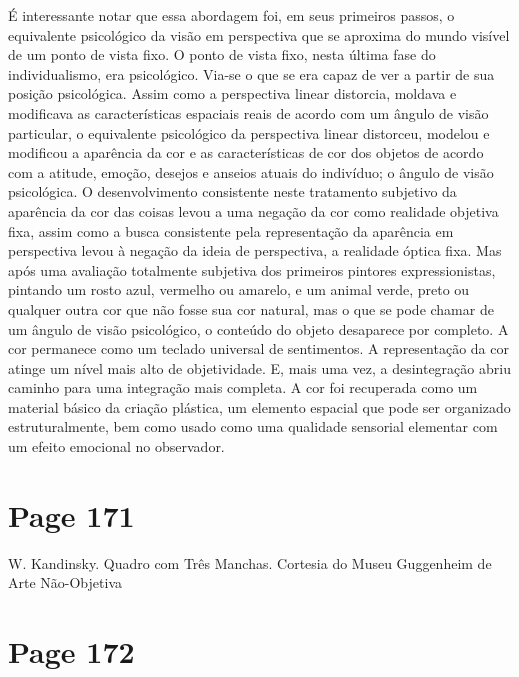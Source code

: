 \documentclass[a4paper]{article}
\begin{document}
É interessante notar que essa abordagem foi, em seus primeiros passos, o equivalente psicológico da visão em perspectiva que se aproxima do mundo visível de um ponto de vista fixo. O ponto de vista fixo, nesta última fase do individualismo, era psicológico. Via-se o que se era capaz de ver a partir de sua posição psicológica. Assim como a perspectiva linear distorcia, moldava e modificava as características espaciais reais de acordo com um ângulo de visão particular, o equivalente psicológico da perspectiva linear distorceu, modelou e modificou a aparência da cor e as características de cor dos objetos de acordo com a atitude, emoção, desejos e anseios atuais do indivíduo; o ângulo de visão psicológica. O desenvolvimento consistente neste tratamento subjetivo da aparência da cor das coisas levou a uma negação da cor como realidade objetiva fixa, assim como a busca consistente pela representação da aparência em perspectiva levou à negação da ideia de perspectiva, a realidade óptica fixa. Mas após uma avaliação totalmente subjetiva dos primeiros pintores expressionistas, pintando um rosto azul, vermelho ou amarelo, e um animal verde, preto ou qualquer outra cor que não fosse sua cor natural, mas o que se pode chamar de um ângulo de visão psicológico, o conteúdo do objeto desaparece por completo. A cor permanece como um teclado universal de sentimentos. A representação da cor atinge um nível mais alto de objetividade. E, mais uma vez, a desintegração abriu caminho para uma integração mais completa. A cor foi recuperada como um material básico da criação plástica, um elemento espacial que pode ser organizado estruturalmente, bem como usado como uma qualidade sensorial elementar com um efeito emocional no observador.

\newpage
\section*{Page 171}

\centering
W. Kandinsky. Quadro com Três Manchas. Cortesia do Museu Guggenheim de Arte Não-Objetiva


\newpage
\section*{Page 172}
\end{document}
